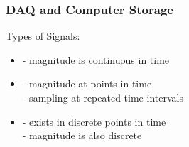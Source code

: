 \documentclass[fleqn]{beamer} %
\newcommand{\sectionIsubsectionItitle}{DAQ and Computer Storage}
\begin{document}
			\begin{frame}
				\frametitle{\sectionIsubsectionItitle}

				Types of Signals: \vspace{3mm}\\

				\begin{itemize}
					\item \underline{\hspace{20mm}} - magnitude is continuous in time   \vspace{3mm} \\
					\item \underline{\hspace{20mm}} \hspace{2mm} \underline{\hspace{10mm}} - magnitude at points in time  \vspace{3mm} \\
					\hspace*{15mm} - sampling at repeated time intervals  \vspace{3mm} \\
					\item \underline{\hspace{20mm}} - exists in discrete points in time  \vspace{3mm} \\
								 - magnitude is also discrete  \vspace{3mm} \\
				\end{itemize}
		
			\end{frame}
\end{document}
